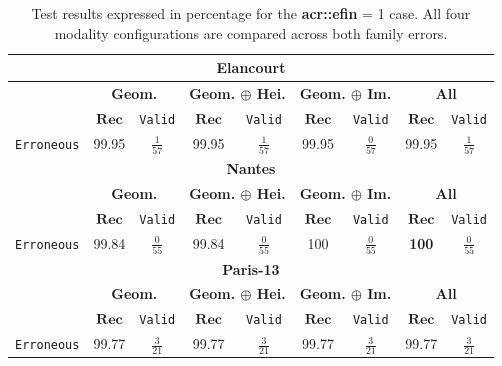         \begin{table}
            \footnotesize
            \renewcommand{\arraystretch}{1.5}
            \begin{tabular}{|c | c c | c c | c c | c c |}
                \hline
                \multicolumn{9}{|c|}{\textbf{Elancourt}}\\
                \hline
                &\multicolumn{2}{c|}{\textbf{Geom.}} & \multicolumn{2}{c|}{\textbf{Geom. \(\oplus\) Hei.}} & \multicolumn{2}{c|}{\textbf{Geom. \(\oplus\) Im.}} & \multicolumn{2}{x{2.4cm}|}{\textbf{All}}\\
                \cline{2-9}
                & \(\bm{Rec}\) & \texttt{Valid} &  \(\bm{Rec}\) & \texttt{Valid} &  \(\bm{Rec}\) & \texttt{Valid} &  \(\bm{Rec}\) & \texttt{Valid} \\
                \hline
                \texttt{Erroneous} & 99.95 & $\frac{1}{57}$ & 99.95 & $\frac{1}{57}$ & 99.95 & $\frac{0}{57}$ & 99.95 & $\frac{1}{57}$ \\
                \hline
                \hline
                \multicolumn{9}{|c|}{\textbf{Nantes}}\\
                \hline
                &\multicolumn{2}{c|}{\textbf{Geom.}} & \multicolumn{2}{c|}{\textbf{Geom. \(\oplus\) Hei.}} & \multicolumn{2}{c|}{\textbf{Geom. \(\oplus\) Im.}} & \multicolumn{2}{x{2.4cm}|}{\textbf{All}}\\
                \cline{2-9}
                & \(\bm{Rec}\) & \texttt{Valid} &  \(\bm{Rec}\) & \texttt{Valid} &  \(\bm{Rec}\) & \texttt{Valid} &  \(\bm{Rec}\) & \texttt{Valid} \\
                \hline
                \texttt{Erroneous} & 99.84 & $\frac{0}{55}$ & 99.84 & $\frac{0}{55}$ & 100 & $\frac{0}{55}$ & \textbf{100} & $\frac{0}{55}$ \\
                \hline
                \hline
                \multicolumn{9}{|c|}{\textbf{Paris-13}}\\
                \hline
                &\multicolumn{2}{c|}{\textbf{Geom.}} & \multicolumn{2}{c|}{\textbf{Geom. \(\oplus\) Hei.}} & \multicolumn{2}{c|}{\textbf{Geom. \(\oplus\) Im.}} & \multicolumn{2}{x{2.4cm}|}{\textbf{All}}\\
                \cline{2-9}
                & \(\bm{Rec}\) & \texttt{Valid} &  \(\bm{Rec}\) & \texttt{Valid} &  \(\bm{Rec}\) & \texttt{Valid} &  \(\bm{Rec}\) & \texttt{Valid} \\
                \hline
                \texttt{Erroneous} & 99.77 & $\frac{3}{21}$ & 99.77 & $\frac{3}{21}$ & 99.77 & $\frac{3}{21}$ & 99.77 & $\frac{3}{21}$ \\
                \hline
            \end{tabular}
            \renewcommand{\arraystretch}{1}
            \caption{
                \label{tab::ablation_f1}
                Test results expressed in percentage for the \textbf{\gls{acr::efin}} = 1 case.
                All four modality configurations are compared across both family errors.
            }
        \end{table}
        
